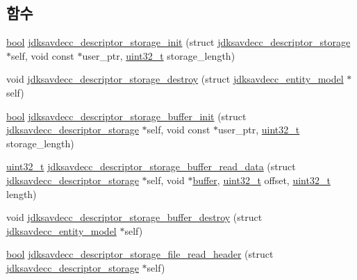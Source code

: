 \subsection*{함수}
\begin{DoxyCompactItemize}
\item 
\hyperlink{avb__gptp_8h_af6a258d8f3ee5206d682d799316314b1}{bool} \hyperlink{group__jdksavdecc__descriptor__storage_ga8057702fdd5c972ac954b7e5d0705d08}{jdksavdecc\+\_\+descriptor\+\_\+storage\+\_\+init} (struct \hyperlink{structjdksavdecc__descriptor__storage}{jdksavdecc\+\_\+descriptor\+\_\+storage} $\ast$self, void const $\ast$user\+\_\+ptr, \hyperlink{parse_8c_a6eb1e68cc391dd753bc8ce896dbb8315}{uint32\+\_\+t} storage\+\_\+length)
\item 
void \hyperlink{group__jdksavdecc__descriptor__storage_gafd2b10b04fedb78ed65940116a9d35bb}{jdksavdecc\+\_\+descriptor\+\_\+storage\+\_\+destroy} (struct \hyperlink{structjdksavdecc__entity__model}{jdksavdecc\+\_\+entity\+\_\+model} $\ast$self)
\item 
\hyperlink{avb__gptp_8h_af6a258d8f3ee5206d682d799316314b1}{bool} \hyperlink{group__jdksavdecc__descriptor__storage_gab3c18d55166e22415004d5b6a6a7b87e}{jdksavdecc\+\_\+descriptor\+\_\+storage\+\_\+buffer\+\_\+init} (struct \hyperlink{structjdksavdecc__descriptor__storage}{jdksavdecc\+\_\+descriptor\+\_\+storage} $\ast$self, void const $\ast$user\+\_\+ptr, \hyperlink{parse_8c_a6eb1e68cc391dd753bc8ce896dbb8315}{uint32\+\_\+t} storage\+\_\+length)
\item 
\hyperlink{parse_8c_a6eb1e68cc391dd753bc8ce896dbb8315}{uint32\+\_\+t} \hyperlink{group__jdksavdecc__descriptor__storage_gaeb0c0ea255f21a660b890061e5083d81}{jdksavdecc\+\_\+descriptor\+\_\+storage\+\_\+buffer\+\_\+read\+\_\+data} (struct \hyperlink{structjdksavdecc__descriptor__storage}{jdksavdecc\+\_\+descriptor\+\_\+storage} $\ast$self, void $\ast$\hyperlink{_hello_test_8cpp_a8be6d469a7cd1c8d66cc6d2d1e10c65b}{buffer}, \hyperlink{parse_8c_a6eb1e68cc391dd753bc8ce896dbb8315}{uint32\+\_\+t} offset, \hyperlink{parse_8c_a6eb1e68cc391dd753bc8ce896dbb8315}{uint32\+\_\+t} length)
\item 
void \hyperlink{group__jdksavdecc__descriptor__storage_gad6e346417d827a92e2c65a591df14107}{jdksavdecc\+\_\+descriptor\+\_\+storage\+\_\+buffer\+\_\+destroy} (struct \hyperlink{structjdksavdecc__entity__model}{jdksavdecc\+\_\+entity\+\_\+model} $\ast$self)
\item 
\hyperlink{avb__gptp_8h_af6a258d8f3ee5206d682d799316314b1}{bool} \hyperlink{group__jdksavdecc__descriptor__storage_gaa7f5f2020e7d11a27753e413d0580d41}{jdksavdecc\+\_\+descriptor\+\_\+storage\+\_\+file\+\_\+read\+\_\+header} (struct \hyperlink{structjdksavdecc__descriptor__storage}{jdksavdecc\+\_\+descriptor\+\_\+storage} $\ast$self)

\end{DoxyCompactItemize}
